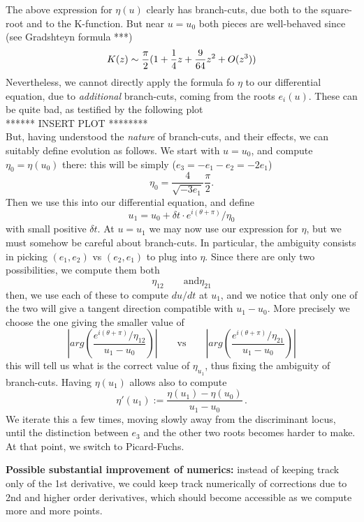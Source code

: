 \documentclass[11pt]{article}
\newcommand{\be}{\begin{equation}}
\newcommand{\ee}{\end{equation}}
\begin{document}
The above expression for $\eta(u)$ clearly has branch-cuts, due both to the square-root and to the K-function.
But near $u=u_{0}$ both pieces are well-behaved since (see Gradshteyn formula ***)
\be
	K(z) \sim {\pi\over 2}(1+ {1\over 4}z + {9\over 64} z^{2} +O(z^{3}))
\ee
Nevertheless, we cannot directly apply the formula fo $\eta$ to our differential equation, due to \emph{additional} branch-cuts, coming from the roots $e_{i}(u)$. These can be quite bad, as testified by the following plot \\
****** INSERT PLOT ********\\
But, having understood the \emph{nature} of branch-cuts, and their effects, we can suitably define evolution as follows.
We start with $u=u_{0}$, and compute $\eta_{0} = \eta(u_{0})$ there: this will be simply ($e_{3} = -e_{1}-e_{2} = -2e_{1}$)
\be
	\eta_{0} = \frac{4}{\sqrt{-3 e_{1}}}\frac{\pi}{2}.
\ee
Then we use this into our differential equation, and define
\be
	u_{1} = u_{0} + \delta t \cdot  e^{i(\theta +\pi)} / \eta_{0}
\ee
with small positive $\delta t$.
At $u=u_{1}$ we may now use our expression for $\eta$, but we must somehow be careful about branch-cuts. In particular, the ambiguity consists in picking $(e_{1}, e_{2})$ vs $(e_{2}, e_{1})$ to plug into $\eta$. Since there are only two possibilities, we compute them both
\be
	\eta_{12} \qquad \text{and} \eta_{21}
\ee
then, we use each of these to compute $du/dt$ at $u_{1}$, and we notice that only one of the two will give a tangent direction compatible with $u_{1}-u_{0}$. More precisely we choose the one giving the smaller value of
\be
	\left|arg\left(  \frac{e^{i(\theta +\pi)} / \eta_{12}}{u_{1}-u_{0}} \right) \right| %
	\qquad \text{vs} \qquad %
	\left|arg\left(  \frac{e^{i(\theta +\pi)} / \eta_{21}}{u_{1}-u_{0}} \right) \right|
\ee
this will tell us what is the correct value of $\eta_{u_{1}}$, thus fixing the ambiguity of branch-cuts.
Having $\eta(u_{1})$ allows also to compute 
\be
	\eta'(u_{1}) := \frac{\eta(u_{1}) - \eta(u_{0})}{u_{1}-u_{0}}\,.
\ee
We iterate this a few times, moving slowly away from the discriminant locus, until the distinction between $e_{3}$ and the other two roots becomes harder to make. At that point, we switch to Picard-Fuchs.

\bigskip

{\bf Possible substantial improvement of numerics:} instead of keeping track only of the 1st derivative, we could keep track numerically of corrections due to 2nd and higher order derivatives,
which should become accessible as we compute more and more points.
\end{document}
